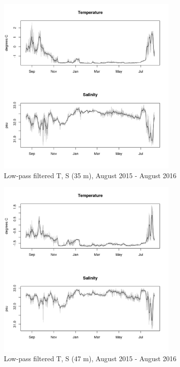 \documentclass[12pt]{dforeport}
\begin{document}
\begin{figure}  
\centering
\includegraphics[width = 0.8\textwidth]{./figures/32_lpf_TS_35m_2015_2016.png}
\caption[Low-pass filtered T, S (35 m), 2015-2016]{Low-pass filtered T, S (35 m), August 2015 - August 2016}
\label{f:ctd_35_lpf_2015_2016}
\end{figure}

\begin{figure}  
\centering
\includegraphics[width = 0.8\textwidth]{./figures/33_lpf_TS_47m_2015_2016.png}
\caption[Low-pass filtered T, S (47 m), 2015-2016]{Low-pass filtered T, S (47 m), August 2015 - August 2016}
\label{f:ctd_47_lpf_2015_2016}
\end{figure}
\end{document}
